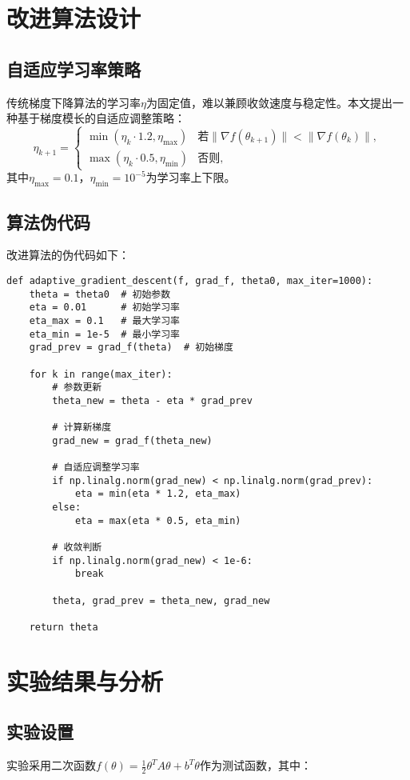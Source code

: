 \documentclass[12pt,a4paper,oneside]{article} %
\begin{document}
\section{改进算法设计}
\subsection{自适应学习率策略}
传统梯度下降算法的学习率$\eta$为固定值，难以兼顾收敛速度与稳定性。本文提出一种基于梯度模长的自适应调整策略：
\[
\eta_{k+1} = 
\begin{cases} 
\min(\eta_k \cdot 1.2, \eta_{\text{max}}) & \text{若} \|\nabla f(\theta_{k+1})\| < \|\nabla f(\theta_k)\|, \\
\max(\eta_k \cdot 0.5, \eta_{\text{min}}) & \text{否则},
\end{cases}
\]
其中$\eta_{\text{max}} = 0.1$，$\eta_{\text{min}} = 10^{-5}$为学习率上下限。

\subsection{算法伪代码}
改进算法的伪代码如下：
\begin{lstlisting}[caption={自适应梯度下降算法}, label={alg:agd}]
def adaptive_gradient_descent(f, grad_f, theta0, max_iter=1000):
    theta = theta0  # 初始参数
    eta = 0.01      # 初始学习率
    eta_max = 0.1   # 最大学习率
    eta_min = 1e-5  # 最小学习率
    grad_prev = grad_f(theta)  # 初始梯度
    
    for k in range(max_iter):
        # 参数更新
        theta_new = theta - eta * grad_prev
        
        # 计算新梯度
        grad_new = grad_f(theta_new)
        
        # 自适应调整学习率
        if np.linalg.norm(grad_new) < np.linalg.norm(grad_prev):
            eta = min(eta * 1.2, eta_max)
        else:
            eta = max(eta * 0.5, eta_min)
        
        # 收敛判断
        if np.linalg.norm(grad_new) < 1e-6:
            break
            
        theta, grad_prev = theta_new, grad_new
    
    return theta
\end{lstlisting}


\section{实验结果与分析}
\subsection{实验设置}
实验采用二次函数$f(\theta) = \frac{1}{2} \theta^T A \theta + b^T \theta$作为测试函数，其中：
\end{document}
